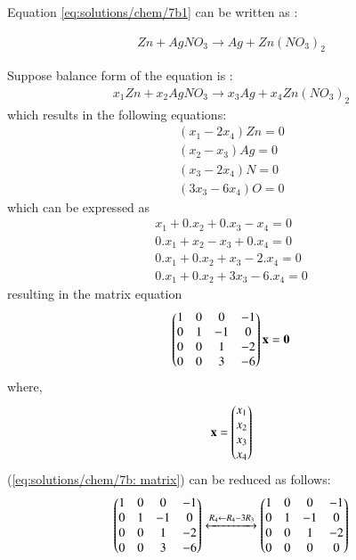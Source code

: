
Equation \ref{eq:solutions/chem/7b1}  can be written as :

\begin{align}
\label{eq:solutions/chem/7b2} Zn+ AgNO_{3} \to Ag + Zn(NO_{3})_{2}
\end{align}

Suppose balance form of the equation is :
\begin{align}
    \label{eq:solutions/chem/7b3} x_{1}Zn+ x_{2}AgNO_{3} \to x_{3}Ag + x_{4} Zn(NO_{3})_{2}
\end{align}
which results in the following equations:
\begin{align}
    ( x_{1} - 2x_{4} ) Zn = 0\\
    ( x_{2} - x_{3} ) Ag = 0\\
    ( x_{3} - 2 x_{4} ) N =0\\
    ( 3x_{3} - 6x_{4} ) O = 0
\end{align}
which can be expressed as
\begin{align}
    x_{1} + 0.x_{2} + 0.x_{3} - x_{4} = 0\\
    0.x_{1} + x_{2} - x_{3} + 0.x_{4} = 0\\
    0.x_{1} + 0.x_{2} + x_{3} - 2.x_{4} =0\\
    0.x_{1} + 0.x_{2} + 3x_{3} - 6.x_{4}= 0
\end{align}
resulting in the matrix equation
\begin{align}
    \label{eq:solutions/chem/7b: matrix}
    \begin{pmatrix}1 & 0 & 0 & -1\\
           0 & 1 & -1 & 0\\
           0 & 0 & 1 & -2\\
           0 & 0 & 3 & -6 \end{pmatrix}\mathbf{x}
           =\mathbf{0}
\end{align}
where,
\begin{align}
   \mathbf{x}= \begin{pmatrix}x_{1}\\x_{2}\\x_{3}\\x_{4}\end{pmatrix}
\end{align}
(\ref{eq:solutions/chem/7b: matrix}) can be reduced as follows:
\begin{align}
    \begin{pmatrix}1 & 0 & 0 & -1\\
   	0 & 1 & -1 & 0\\
   	0 & 0 & 1 & -2\\
   	0 & 0 & 3 & -6 \end{pmatrix}
    \xleftrightarrow {R_{4}\leftarrow R_4 - 3R_3}
      \begin{pmatrix}1 & 0 & 0 & -1\\
    	0 & 1 & -1 & 0\\
    	0 & 0 & 1 & -2\\
    	0 & 0 & 0 & 0 \end{pmatrix}
    \end{align}
